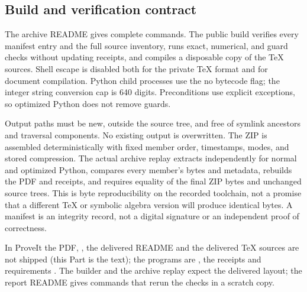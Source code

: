 \subsection{Build and verification contract}
The archive README gives complete commands. The public build verifies every manifest entry and the full source inventory, runs exact, numerical, and guard checks without updating receipts, and compiles a disposable copy of the TeX sources. Shell escape is disabled both for the private TeX format and for document compilation. Python child processes use the no bytecode flag; the integer string conversion cap is 640 digits. Preconditions use explicit exceptions, so optimized Python does not remove guards.

Output paths must be new, outside the source tree, and free of symlink ancestors and traversal components. No existing output is overwritten. The ZIP is assembled deterministically with fixed member order, timestamps, modes, and stored compression. The actual archive replay extracts independently for normal and optimized Python, compares every member's bytes and metadata, rebuilds the PDF and receipts, and requires equality of the final ZIP bytes and unchanged source trees. This is byte reproducibility on the recorded toolchain, not a promise that a different TeX or symbolic algebra version will produce identical bytes. A manifest is an integrity record, not a digital signature or an independent proof of correctness.
\begin{writenote}
In ProveIt the PDF, , the delivered README and the
delivered TeX sources are not shipped (this Part is the text); the programs are
, the receipts and requirements
. The builder and the archive replay expect the
delivered layout; the report README gives commands that rerun the checks in a
scratch copy.
\end{writenote}

